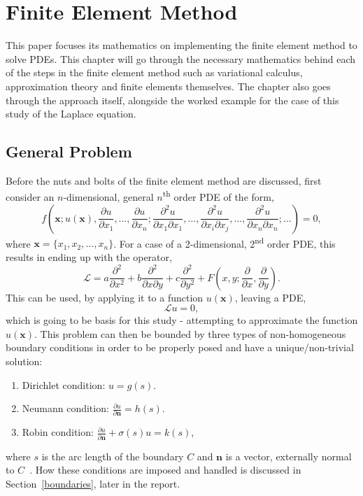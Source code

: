 \clearpage
\chapter{Finite Element Method}

This paper focuses its mathematics on implementing the finite element method to solve PDEs. This chapter will go through the necessary mathematics behind each of the steps in the finite element method such as variational calculus, approximation theory and finite elements themselves. The chapter also goes through the approach itself, alongside the worked example for the case of this study of the Laplace equation.

\section{General Problem}

Before the nuts and bolts of the finite element method are discussed, first consider an $n$-dimensional, general $n$\textsuperscript{th} order PDE of the form,
\begin{equation}
	f\left(\mathbf{x}; u(\mathbf{x}), \frac{\partial u}{\partial x_1},\dots, \frac{\partial u}{\partial x_n}; \frac{\partial^2 u}{\partial x_1 \partial x_1},\dots,\frac{\partial^2 u}{\partial x_i \partial x_j},\dots, \frac{\partial^2 u}{\partial x_n \partial x_n}; \dots\right) = 0,
\end{equation}
where $\mathbf{x} = \{x_1,x_2,\dots,x_n\}$.
For a case of a 2-dimensional, 2\textsuperscript{nd} order PDE, this results in ending up with the operator,
\begin{equation}
	\mathcal{L} = a \frac{\partial^2}{\partial x^2} + b \frac{\partial^2}{\partial x \partial y} + c \frac{\partial^2}{\partial y^2} + F\left(x,y; \frac{\partial}{\partial x}, \frac{\partial}{\partial y}\right).
\end{equation}
This can be used, by applying it to a function $u(\mathbf{x})$, leaving a PDE,
\begin{equation}\label{pde}
	\mathcal{L}u = 0,
\end{equation}
which is going to be basis for this study - attempting to approximate the function $u(\mathbf{x})$. This problem can then be bounded by three types of non-homogeneous boundary conditions in order to be properly posed and have a unique/non-trivial solution:
\begin{enumerate}
	\item Dirichlet condition: $u=g(s)$.
	\item Neumann condition: $\frac{\partial u}{\partial \mathbf{n}} = h(s)$.
	\item Robin condition: $\frac{\partial u}{\partial \mathbf{n}} + \sigma(s)u = k(s)$,
\end{enumerate}
where $s$ is the arc length of the boundary $C$ and $\mathbf{n}$ is a vector, externally normal to $C$~\cite{davies}. How these conditions are imposed and handled is discussed in Section~\ref{boundaries}, later in the report.

